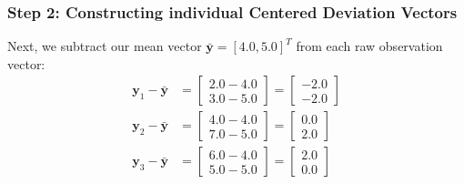 \documentclass{article}
\begin{document}
\subsubsection{Step 2: Constructing individual Centered Deviation Vectors}
Next, we subtract our mean vector $\bar{\mathbf{y}} = [4.0, 5.0]^T$ from each raw observation vector:
\begin{align}
\mathbf{y}_1 - \bar{\mathbf{y}} &= \begin{bmatrix} 2.0 - 4.0 \\ 3.0 - 5.0 \end{bmatrix} = \begin{bmatrix} -2.0 \\ -2.0 \end{bmatrix} \\
\mathbf{y}_2 - \bar{\mathbf{y}} &= \begin{bmatrix} 4.0 - 4.0 \\ 7.0 - 5.0 \end{bmatrix} = \begin{bmatrix} 0.0 \\ 2.0 \end{bmatrix} \\
\mathbf{y}_3 - \bar{\mathbf{y}} &= \begin{bmatrix} 6.0 - 4.0 \\ 5.0 - 5.0 \end{bmatrix} = \begin{bmatrix} 2.0 \\ 0.0 \end{bmatrix}
\end{align}
\end{document}
